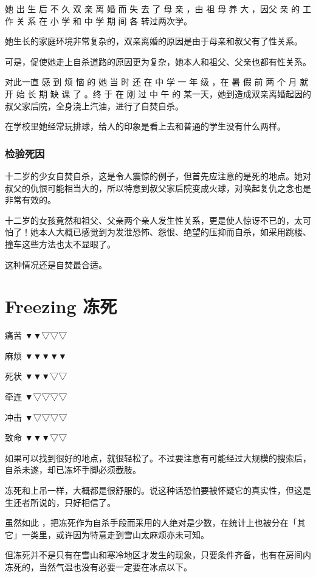 \documentclass[UTF8]{ctexart}
\begin{document}
她 出 生 后 不 久 双 亲 离 婚 而 失 去 了 母 亲 ，由 祖 母 养 大 ，因父 亲 的 工 作 关 系 在 小 学 和 中 学 期 间 各 转过两次学。

她生长的家庭环境非常复杂的，双亲离婚的原因是由于母亲和叔父有了性关系。
 
可是，促使她走上自杀道路的原因更为复杂，她本人和祖父、父亲也都有性关系。

对此一直 感 到 烦 恼 的 她 当 时 还 在 中 学 一 年 级 ，在 暑 假 前 两 个 月 就 开 始 长 期 缺 课 了 。终 于 在 刚 过 中 午 的 某一天，她到造成双亲离婚起因的叔父家后院，全身浇上汽油，进行了自焚自杀。

在学校里她经常玩排球，给人的印象是看上去和普通的学生没有什么两样。

\subsubsection*{检验死因}

十二岁的少女自焚自杀，这是令人震惊的例子，但首先应注意的是死的地点。她对叔父的仇恨可能相当大的，所以特意到叔父家后院变成火球，对唤起复仇之念也是非常有效的。

十二岁的女孩竟然和祖父、父亲两个亲人发生性关系，更是使人惊讶不已的，太可怕了！她本人大概已感觉到为发泄恐怖、怨恨、绝望的压抑而自杀，如采用跳楼、撞车这些方法也太不显眼了。

这种情况还是自焚最合适。



\newpage

\section{Freezing 冻死}

痛苦 ▼▼▽▽▽

麻烦 ▼▼▼▼▼

死状 ▼▼▼▽▽

牵连 ▼▽▽▽▽

冲击 ▼▽▽▽▽

致命 ▼▼▼▽▽

如果可以找到很好的地点，就很轻松了。不过要注意有可能经过大规模的搜索后，自杀未遂，却已冻坏手脚必须截肢。

冻死和上吊一样，大概都是很舒服的。说这种话恐怕要被怀疑它的真实性，但这是生还者所说的，只好相信了。

虽然如此 ，把冻死作为自杀手段而采用的人绝对是少数，在统计上也被分在「其它」一类里，或许因为特意走到雪山太麻烦亦未可知。

但冻死并不是只有在雪山和寒冷地区才发生的现象，只要条件齐备，也有在房间内冻死的，当然气温也没有必要一定要在冰点以下。
\end{document}
